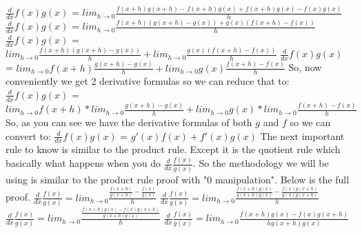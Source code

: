 \documentclass{article}
\begin{document}
$\frac{d}{dx} f(x) g(x)$ = $lim_{h\to 0} \frac{f(x+h)g(x+h) - f(x+h)g(x)+f(x+h)g(x) - f(x)g(x)}{h}$
\newline
\newline
$\frac{d}{dx} f(x) g(x)$ = $lim_{h\to 0} \frac{f(x+h)(g(x+h) - g(x))+g(x)(f(x+h) - f(x))}{h}$
\newline
\newline
$\frac{d}{dx} f(x) g(x)$ = $lim_{h\to 0} \frac{f(x+h)(g(x+h) - g(x))}{h}   +lim_{h\to 0}\frac{g(x)(f(x+h) - f(x))}{h}$
\newline
\newline
$\frac{d}{dx} f(x) g(x)$ = $lim_{h\to 0} f(x+h) \frac{g(x+h) - g(x)}{h}   +lim_{h\to 0}g(x)\frac{f(x+h) - f(x)}{h}$
\newline
\newline
So, now conveniently we get 2 derivative formulas so we can reduce that to:
\newline
\newline
$\frac{d}{dx} f(x) g(x)$ = $lim_{h\to 0} f(x+h) * lim_{h\to 0}  \frac{g(x+h) - g(x)}{h}   +lim_{h\to 0}g(x) * lim_{h\to 0}\frac{f(x+h) - f(x)}{h}$
\newline
\newline
So, as you can see we have the derivative formulas of both $g$ and $f$ so we can convert to:
\newline
\newline
$\frac{d}{dx} f(x) g(x)$ = $g'(x)f(x) + f'(x)g(x)$
\newline
\newline
The next important rule to know is similar to the product rule. Except it is the quotient rule which basically what happens when you do $\frac{d}{dx}\frac{f(x)}{g(x)}$. So the methodology we will be using is similar to the product rule proof with "$0$ manipulation". Below is the full proof.
\newline
\newline
$\frac{d}{dx}\frac{f(x)}{g(x)} = lim_{h\to 0} \frac{\frac{f(x+h)}{g(x+h)} - \frac{f(x)}{g(x)}}{h}$
\newline
\newline
$\frac{d}{dx}\frac{f(x)}{g(x)} = lim_{h\to 0} \frac{\frac{f(x+h)g(x)}{g(x+h)g(x)} - \frac{f(x)g(x+h)}{g(x)g(x+h)}}{h}$
\newline
\newline
$\frac{d}{dx}\frac{f(x)}{g(x)} = lim_{h\to 0} \frac{\frac{f(x+h)g(x) - f(x)g(x+h)}{g(x+h)g(x)}}{h}$
\newline
\newline
$\frac{d}{dx}\frac{f(x)}{g(x)} = lim_{h\to 0} \frac{f(x+h)g(x) - f(x)g(x+h)}{hg(x+h)g(x)}$
\end{document}
